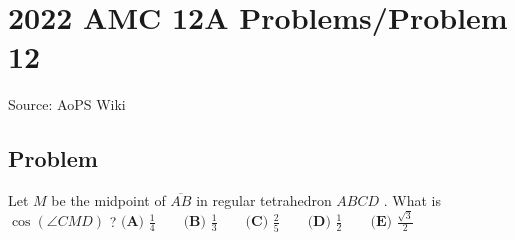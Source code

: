 \documentclass[12pt]{article}
\begin{document}
\section*{{2022 AMC 12A Problems/Problem 12}}
Source: AoPS Wiki

\subsection*{Problem}
Let $M$ be the midpoint of $\overline{AB}$ in regular tetrahedron $ABCD$ . What is $\cos(\angle CMD)$ ? $\textbf{(A) } \frac14 \qquad \textbf{(B) } \frac13 \qquad \textbf{(C) } \frac25 \qquad \textbf{(D) } \frac12 \qquad \textbf{(E) } \frac{\sqrt{3}}{2}$
\end{document}
